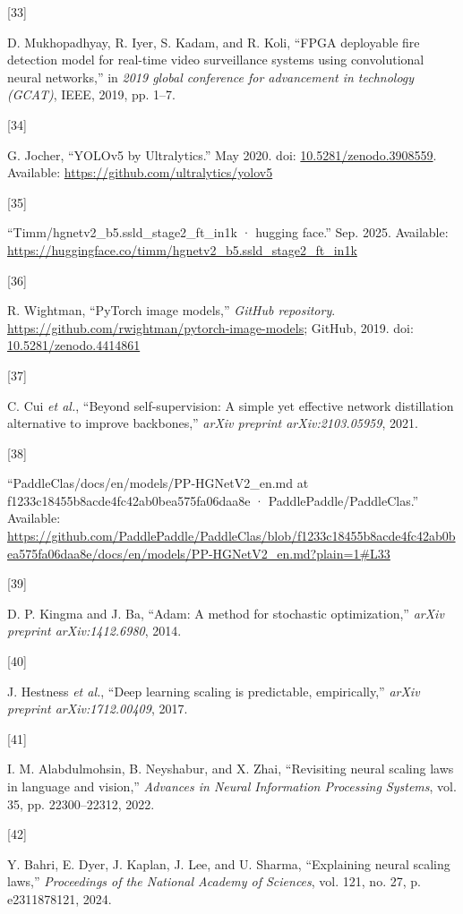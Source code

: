 \documentclass[
  10pt,
]{article}
\newlength{\cslhangindent}
\newlength{\csllabelwidth}
\newenvironment{CSLReferences}[2] %
 {\begin{list}{}{%
  \setlength{\itemindent}{0pt}
  \setlength{\leftmargin}{0pt}
  \setlength{\parsep}{0pt}
  \ifodd #1
   \setlength{\leftmargin}{\cslhangindent}
   \setlength{\itemindent}{-1\cslhangindent}
  \fi
  \setlength{\itemsep}{#2\baselineskip}}}
 {\end{list}}
\newcommand{\CSLLeftMargin}[1]{\parbox[t]{\csllabelwidth}{\strut#1\strut}}
\newcommand{\CSLRightInline}[1]{\parbox[t]{\linewidth - \csllabelwidth}{\strut#1\strut}}
\begin{document}
\begin{CSLReferences}{0}{0}
\CSLLeftMargin{{[}33{]} }%
\CSLRightInline{D. Mukhopadhyay, R. Iyer, S. Kadam, and R. Koli, {``FPGA
deployable fire detection model for real-time video surveillance systems
using convolutional neural networks,''} in \emph{2019 global conference
for advancement in technology (GCAT)}, IEEE, 2019, pp. 1--7.}

\CSLLeftMargin{{[}34{]} }%
\CSLRightInline{G. Jocher, {``{YOLOv5 by Ultralytics}.''} May 2020. doi:
\href{https://doi.org/10.5281/zenodo.3908559}{10.5281/zenodo.3908559}.
Available: \url{https://github.com/ultralytics/yolov5}}

\CSLLeftMargin{{[}35{]} }%
\CSLRightInline{{``Timm/hgnetv2\_b5.ssld\_stage2\_ft\_in1k · hugging
face.''} Sep. 2025. Available:
\url{https://huggingface.co/timm/hgnetv2_b5.ssld_stage2_ft_in1k}}

\CSLLeftMargin{{[}36{]} }%
\CSLRightInline{R. Wightman, {``PyTorch image models,''} \emph{GitHub
repository}. \url{https://github.com/rwightman/pytorch-image-models};
GitHub, 2019. doi:
\href{https://doi.org/10.5281/zenodo.4414861}{10.5281/zenodo.4414861}}

\CSLLeftMargin{{[}37{]} }%
\CSLRightInline{C. Cui \emph{et al.}, {``Beyond self-supervision: A
simple yet effective network distillation alternative to improve
backbones,''} \emph{arXiv preprint arXiv:2103.05959}, 2021.}

\CSLLeftMargin{{[}38{]} }%
\CSLRightInline{{``PaddleClas/docs/en/models/PP-HGNetV2\_en.md at
f1233c18455b8acde4fc42ab0bea575fa06daa8e · PaddlePaddle/PaddleClas.''}
Available:
\url{https://github.com/PaddlePaddle/PaddleClas/blob/f1233c18455b8acde4fc42ab0bea575fa06daa8e/docs/en/models/PP-HGNetV2_en.md?plain=1\#L33}}

\CSLLeftMargin{{[}39{]} }%
\CSLRightInline{D. P. Kingma and J. Ba, {``Adam: A method for stochastic
optimization,''} \emph{arXiv preprint arXiv:1412.6980}, 2014.}

\CSLLeftMargin{{[}40{]} }%
\CSLRightInline{J. Hestness \emph{et al.}, {``Deep learning scaling is
predictable, empirically,''} \emph{arXiv preprint arXiv:1712.00409},
2017.}

\CSLLeftMargin{{[}41{]} }%
\CSLRightInline{I. M. Alabdulmohsin, B. Neyshabur, and X. Zhai,
{``Revisiting neural scaling laws in language and vision,''}
\emph{Advances in Neural Information Processing Systems}, vol. 35, pp.
22300--22312, 2022.}

\CSLLeftMargin{{[}42{]} }%
\CSLRightInline{Y. Bahri, E. Dyer, J. Kaplan, J. Lee, and U. Sharma,
{``Explaining neural scaling laws,''} \emph{Proceedings of the National
Academy of Sciences}, vol. 121, no. 27, p. e2311878121, 2024.}

\end{CSLReferences}
\end{document}

